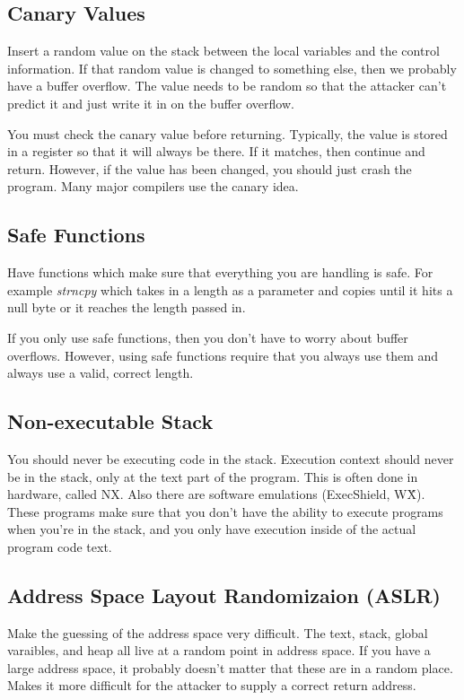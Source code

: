 \documentclass[psamsfonts]{amsart}
\begin{document}
\subsection{Canary Values}

Insert a random value on the stack between the local variables and the control information. If that random value is changed to something else, then we probably have a buffer overflow. The value needs to be random so that the attacker can't predict it and just write it in on the buffer overflow.

You must check the canary value before returning. Typically, the value is stored in a register so that it will always be there. If it matches, then continue and return. However, if the value has been changed, you should just crash the program. Many major compilers use the canary idea.

\subsection{Safe Functions}

Have functions which make sure that everything you are handling is safe. For example \emph{strncpy} which takes in a length as a parameter and copies until it hits a null byte or it reaches the length passed in.

If you only use safe functions, then you don't have to worry about buffer overflows. However, using safe functions require that you always use them and always use a valid, correct length.

\subsection{Non-executable Stack}

You should never be executing code in the stack. Execution context should never be in the stack, only at the text part of the program. This is often done in hardware, called NX. Also there are software emulations (ExecShield, W\^X). These programs make sure that you don't have the ability to execute programs when you're in the stack, and you only have execution inside of the actual program code text.

\subsection{Address Space Layout Randomizaion (ASLR)}

Make the guessing of the address space very difficult. The text, stack, global varaibles, and heap all live at a random point in address space. If you have a large address space, it probably doesn't matter that these are in a random place. Makes it more difficult for the attacker to supply a correct return address.
\end{document}

